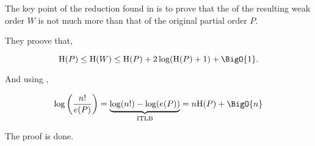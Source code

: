 \section{}
\label{tree:pop:itlb}

The key point of the reduction found in \cite{jcardin1} is to prove that the  of the resulting weak order $W$ is not much more than that of the original partial order $P$.

They proove that,

\begin{equation}
\text{H}(P) \leq \text{H}(W) \leq \text{H}(P) + 2 \log(\text{H}(P) + 1) + \BigO{1}.
\label{eq:jcardin1}
\end{equation}


And using \cite{kahnkim1},

\begin{equation}
\log\left(\frac{n!}{e(P)}\right) = \underbrace{\log(n!) - \log(e(P))}_\text{ITLB} = n \text{H}(P) + \BigO{n}
\label{eq:khankim1}
\end{equation}

The proof is done.
